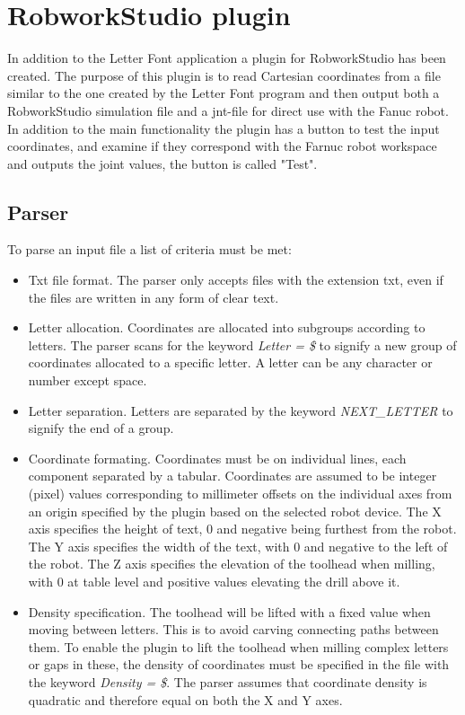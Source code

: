 \section{RobworkStudio plugin}
\label{sec:plugin}
In addition to the Letter Font application a plugin for RobworkStudio has been created. The purpose of this plugin is to read Cartesian coordinates from a file similar to the one created by the Letter Font program and then output both a RobworkStudio simulation file and a jnt-file for direct use with the Fanuc robot. In addition to the main functionality the plugin has a button to test the input coordinates, and examine if they correspond with the Farnuc robot workspace and outputs the joint values, the button is called "Test".

\subsection{Parser}
\label{sec:parser}
To parse an input file a list of criteria must be met:
\begin{itemize}
	\item Txt file format. The parser only accepts files with the extension txt, even if the files are written in any form of clear text. 
	\item Letter allocation. Coordinates are allocated into subgroups according to letters. The parser scans for the keyword \textit{Letter = \$} to signify a new group of coordinates allocated to a specific letter. A letter can be any character or number except space.
	\item Letter separation. Letters are separated by the keyword \textit{NEXT\_LETTER} to signify the end of a group.
	\item Coordinate formating. Coordinates must be on individual lines, each component separated by a tabular. Coordinates are assumed to be integer (pixel) values corresponding to millimeter offsets on the individual axes from an origin specified by the plugin based on the selected robot device. The X axis specifies the height of text, 0 and negative being furthest from the robot. The Y axis specifies the width of the text, with 0 and negative to the left of the robot. The Z axis specifies the elevation of the toolhead when milling, with 0 at table level and positive values elevating the drill above it.
	\item Density specification. The toolhead will be lifted with a fixed value when moving between letters. This is to avoid carving connecting paths between them. To enable the plugin to lift the toolhead when milling complex letters or gaps in these, the density of coordinates must be specified in the file with the keyword \textit{Density = \$}. The parser assumes that coordinate density is quadratic and therefore equal on both the X and Y axes.
\end{itemize}

